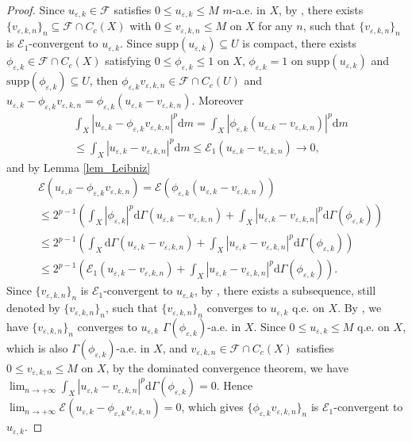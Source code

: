 \documentclass[11pt,a4paper]{article}
\numberwithin{equation}{section}
\theoremstyle{plain}
\theoremstyle{definition}
\begin{document}
\begin{proof}
Since $u_{\varepsilon,k}\in\mathcal{F}$ satisfies $0\le u_{\varepsilon,k}\le M$ $m$-a.e. in $X$, by \cite[Corollary 3.19 (b)]{KS24a}, there exists $\{v_{\varepsilon,k,n}\}_n\subseteq\mathcal{F}\cap C_c(X)$ with $0\le v_{\varepsilon,k,n}\le M$ on $X$ for any $n$, such that $\{v_{\varepsilon,k,n}\}_n$ is $\mathcal{E}_1$-convergent to $u_{\varepsilon,k}$. Since $\mathrm{supp}(u_{\varepsilon,k})\subseteq U$ is compact, there exists $\phi_{\varepsilon,k}\in\mathcal{F}\cap C_c(X)$ satisfying $0\le\phi_{\varepsilon,k}\le1$ on $X$, $\phi_{\varepsilon,k}=1$ on $\mathrm{supp}(u_{\varepsilon,k})$ and $\mathrm{supp}(\phi_{\varepsilon,k})\subseteq U$, then $\phi_{\varepsilon,k} v_{\varepsilon,k,n}\in\mathcal{F}\cap C_c(U)$ and $u_{\varepsilon,k}-\phi_{\varepsilon,k} v_{\varepsilon,k,n}=\phi_{\varepsilon,k}(u_{\varepsilon,k}-v_{\varepsilon,k,n})$. Moreover
\begin{align*}
&\int_X|u_{\varepsilon,k}-\phi_{\varepsilon,k} v_{\varepsilon,k,n}|^p\mathrm{d} m=\int_X|\phi_{\varepsilon,k}(u_{\varepsilon,k}-v_{\varepsilon,k,n})|^p\mathrm{d} m\\
&\le\int_X|u_{\varepsilon,k}-v_{\varepsilon,k,n}|^p\mathrm{d} m\le\mathcal{E}_1(u_{\varepsilon,k}-v_{\varepsilon,k,n})\to0,
\end{align*}
and by Lemma \ref{lem_Leibniz}
\begin{align*}
&\mathcal{E}(u_{\varepsilon,k}-\phi_{\varepsilon,k} v_{\varepsilon,k,n})=\mathcal{E}(\phi_{\varepsilon,k}(u_{\varepsilon,k}- v_{\varepsilon,k,n}))\\
&\le2^{p-1}\left(\int_{X}|\phi_{\varepsilon,k}|^p\mathrm{d}\Gamma(u_{\varepsilon,k}-v_{\varepsilon,k,n})+\int_X|u_{\varepsilon,k}-v_{\varepsilon,k,n}|^p\mathrm{d}\Gamma(\phi_{\varepsilon,k})\right)\\
&\le2^{p-1}\left(\int_{X}\mathrm{d}\Gamma(u_{\varepsilon,k}-v_{\varepsilon,k,n})+\int_X|u_{\varepsilon,k}-v_{\varepsilon,k,n}|^p\mathrm{d}\Gamma(\phi_{\varepsilon,k})\right)\\
&\le2^{p-1}\left(\mathcal{E}_1(u_{\varepsilon,k}-v_{\varepsilon,k,n})+\int_X|u_{\varepsilon,k}-v_{\varepsilon,k,n}|^p\mathrm{d}\Gamma(\phi_{\varepsilon,k})\right).
\end{align*}
Since $\{v_{\varepsilon,k,n}\}_n$ is $\mathcal{E}_1$-convergent to $u_{\varepsilon,k}$, by \cite[Corollary 8.7]{Yan25a}, there exists a subsequence, still denoted by $\{v_{\varepsilon,k,n}\}_n$, such that $\{v_{\varepsilon,k,n}\}_n$ converges to $u_{\varepsilon,k}$ q.e. on $X$. By \cite[Proposition 8.12]{Yan25a}, we have $\{v_{\varepsilon,k,n}\}_n$ converges to $u_{\varepsilon,k}$ $\Gamma(\phi_{\varepsilon,k})$-a.e. in $X$. Since $0\le u_{\varepsilon,k}\le M$ q.e. on $X$, which is also $\Gamma(\phi_{\varepsilon,k})$-a.e. in $X$, and $v_{\varepsilon,k,n}\in\mathcal{F}\cap C_c(X)$ satisfies $0\le v_{\varepsilon,k,n}\le M$ on $X$, by the dominated convergence theorem, we have $\lim_{n\to+\infty}\int_X|u_{\varepsilon,k}-v_{\varepsilon,k,n}|^p\mathrm{d}\Gamma(\phi_{\varepsilon,k})=0$. Hence $\lim_{n\to+\infty}\mathcal{E}(u_{\varepsilon,k}-\phi_{\varepsilon,k} v_{\varepsilon,k,n})=0$, which gives $\{\phi_{\varepsilon,k}v_{\varepsilon,k,n}\}_n$ is $\mathcal{E}_1$-convergent to $u_{\varepsilon,k}$.


\end{proof}
\end{document}
